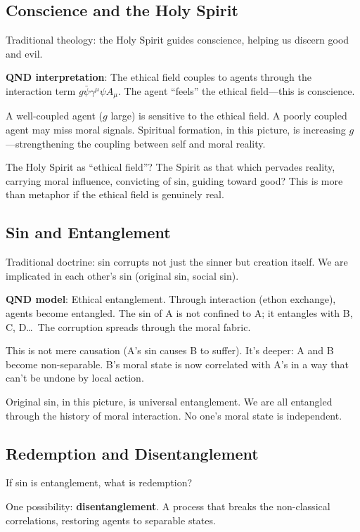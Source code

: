 \documentclass[12pt]{article}
\begin{document}
\subsection{Conscience and the Holy Spirit}

Traditional theology: the Holy Spirit guides conscience, helping us discern good and evil.

\textbf{QND interpretation}: The ethical field couples to agents through the interaction term $g\bar{\psi}\gamma^\mu\psi A_\mu$. The agent ``feels'' the ethical field---this is conscience.

A well-coupled agent ($g$ large) is sensitive to the ethical field. A poorly coupled agent may miss moral signals. Spiritual formation, in this picture, is increasing $g$---strengthening the coupling between self and moral reality.

The Holy Spirit as ``ethical field''? The Spirit as that which pervades reality, carrying moral influence, convicting of sin, guiding toward good? This is more than metaphor if the ethical field is genuinely real.

\subsection{Sin and Entanglement}

Traditional doctrine: sin corrupts not just the sinner but creation itself. We are implicated in each other's sin (original sin, social sin).

\textbf{QND model}: Ethical entanglement. Through interaction (ethon exchange), agents become entangled. The sin of A is not confined to A; it entangles with B, C, D\ldots\ The corruption spreads through the moral fabric.

This is not mere causation (A's sin causes B to suffer). It's deeper: A and B become non-separable. B's moral state is now correlated with A's in a way that can't be undone by local action.

Original sin, in this picture, is universal entanglement. We are all entangled through the history of moral interaction. No one's moral state is independent.

\subsection{Redemption and Disentanglement}

If sin is entanglement, what is redemption?

One possibility: \textbf{disentanglement}. A process that breaks the non-classical correlations, restoring agents to separable states.
\end{document}
